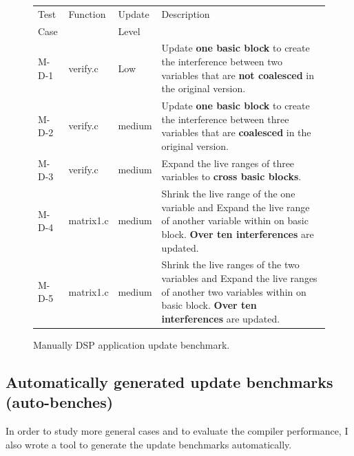 \begin{figure}[htdp]
\begin{small}

\begin{center}
\begin{tabular}{||p{0.5in}|p{0.6in}|p{1.2in}|p{3.5in}||}
\hline
Test &   Function & Update &Description \\
Case & & Level&\\
\hline\hline
M-D-1  & verify.c& Low & Update \textbf{one basic block}  to create
the interference between two variables that are \textbf{not coalesced} 
in the original version.\\
\hline
M-D-2  & verify.c& medium & Update \textbf{one basic block} to create
the interference between three variables that are \textbf{coalesced}
in the original version. \\
\hline
M-D-3  & verify.c& medium & Expand the live ranges of three variables to
\textbf{cross basic blocks}. \\
\hline
M-D-4   & matrix1.c& medium & Shrink the live range of the one variable and
Expand the live range of another variable within on basic block.  \textbf{ Over
ten interferences} are updated.\\
\hline
M-D-5 & matrix1.c& medium  & Shrink the live ranges of the two variables and
Expand the live ranges of another two variables within on basic block.
 \textbf{Over ten interferences} are updated.\\
\hline
\end{tabular}
\end{center}
\caption{Manually DSP application update benchmark.}
\label{dsp-manual}
\end{small}
\vspace{-0.1in}
\end{figure}%

\subsection{Automatically generated update benchmarks (auto-benches)}
In order to study more general cases and to evaluate the compiler performance,
I also wrote a tool to generate the update benchmarks automatically.

